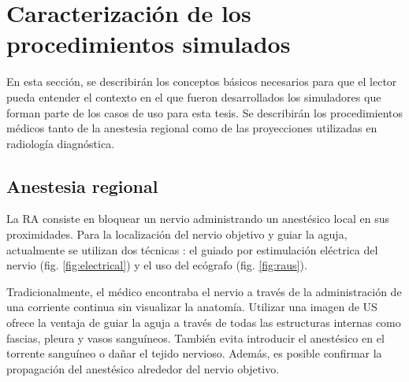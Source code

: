\section{Caracterización de los procedimientos simulados}

En esta sección, se describirán los conceptos básicos necesarios para que el lector pueda entender el contexto en el que fueron desarrollados los simuladores que forman parte de los casos de uso para esta tesis. Se describirán los procedimientos médicos tanto de la anestesia regional como de las proyecciones utilizadas en radiología diagnóstica.

\subsection{Anestesia regional}
\label{art:ra}


La \ac{RA} consiste en bloquear un nervio administrando un anestésico local en sus proximidades. Para la localización del nervio objetivo y guiar la aguja, actualmente se utilizan dos técnicas \cite{ded2.1}: el guiado por estimulación eléctrica del nervio (fig. \ref{fig:electrical}) y el uso del ecógrafo (fig. \ref{fig:raus}).

Tradicionalmente, el médico encontraba el nervio a través de la administración de una corriente continua sin visualizar la anatomía. Utilizar una imagen de \ac{US} ofrece la ventaja de guiar la aguja a través de todas las estructuras internas como fascias, pleura y vasos sanguíneos. También evita introducir el anestésico en el torrente sanguíneo o dañar el tejido nervioso. Además, es posible confirmar la propagación del anestésico alrededor del nervio objetivo.  

